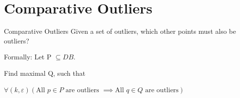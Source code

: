 \documentclass{beamer}
\begin{document}
\section{Comparative Outliers}
    \begin{frame}{Comparative Outliers}
        Given a set of outliers, which other points must also be outliers?

        Formally: Let P $\subseteq DB$. 
        
        Find \alert<2>{maximal} Q, such that 
        
        $\forall (k,\varepsilon) (\text{All } p \in P \text{ are outliers } \implies \text{All } q \in Q \text{ are outliers})$
    \end{frame}
\end{document}

